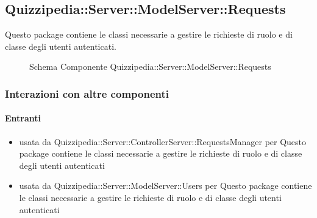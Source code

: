 \subsection{Quizzipedia::Server::ModelServer::Requests}
Questo package contiene le classi necessarie a gestire le richieste di ruolo e di classe degli utenti autenticati.
\begin{figure}[H]
\centering
\noindent{}
\caption[Schema Componente Quizzipedia::Server::ModelServer::Requests]{Schema Componente Quizzipedia::Server::ModelServer::Requests}
\end{figure}
\subsubsection{Interazioni con altre componenti}
\paragraph{Entranti}
\begin{itemize}
\item usata da Quizzipedia::Server::ControllerServer::RequestsManager per Questo package contiene le classi necessarie a gestire le richieste di ruolo e di classe degli utenti autenticati
\item usata da Quizzipedia::Server::ModelServer::Users per Questo package contiene le classi necessarie a gestire le richieste di ruolo e di classe degli utenti autenticati
\end{itemize}

